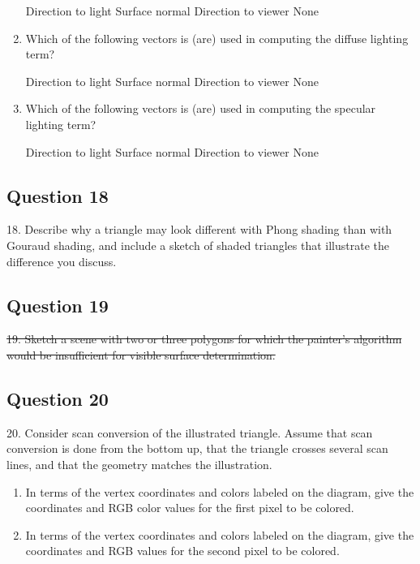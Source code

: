 \documentclass[11pt]{article}
\begin{document}
\begin{spacing}{1.2}
\begin{enumerate}[label=\arabic*)]
	Direction to light \qquad Surface normal \qquad Direction to viewer \qquad None
	\item Which of the following vectors is (are) used in computing the diffuse lighting term?
	
	Direction to light \qquad Surface normal \qquad Direction to viewer \qquad None
	\item Which of the following vectors is (are) used in computing the specular lighting term?
		
	Direction to light \qquad Surface normal \qquad Direction to viewer \qquad None

\end{enumerate}

\subsection{Question 18}
18.  Describe why a triangle may look different with Phong shading than with Gouraud shading, and include a sketch of shaded triangles that illustrate the difference you discuss. 

\subsection{Question 19}
\sout{19.  Sketch a scene with two or three polygons for which the painter's algorithm would be insufficient for visible surface determination.  }

\subsection{Question 20}
20.  Consider scan conversion of the illustrated triangle.  Assume that scan conversion is done from the bottom up, that the triangle crosses several scan lines, and that the geometry matches the illustration.  


\begin{enumerate}[label=\arabic*)]
	\item In terms of the vertex coordinates and colors labeled on the diagram, give the coordinates and RGB color values for the first pixel to be colored.  
	\item In terms of the vertex coordinates and colors labeled on the diagram, give the coordinates and RGB values for the second pixel to be colored.  
\end{enumerate}


\end{spacing}
\end{document}
